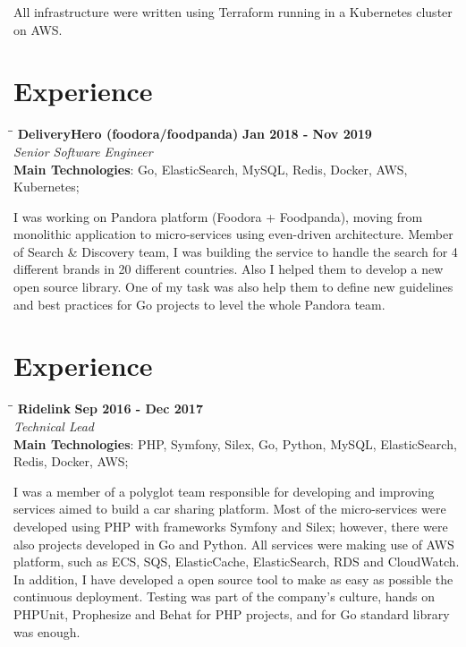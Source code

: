 \documentclass[margin]{res}
\begin{document}
\begin{resume}
All infrastructure were written using Terraform running in a Kubernetes cluster on AWS.

\section{Experience}
\vspace{-0.1in}
    \begin{tabbing}
    \hspace{2.3in}\= \hspace{1.7in}\= \kill %
    \textbf{DeliveryHero (foodora/foodpanda)}    \>\>\textbf{Jan 2018 - Nov 2019}\\
    \textit{Senior Software Engineer}\\
    \textbf{Main Technologies}: Go, ElasticSearch, MySQL, Redis, Docker, AWS, Kubernetes;
    \end{tabbing}\vspace{-20pt}      %
    \vspace{2mm}
I was working on Pandora platform (Foodora + Foodpanda), moving from monolithic application to micro-services using even-driven architecture. Member of Search \& Discovery team, I was building the service to handle the search for 4 different brands in 20 different countries.
Also I helped them to develop a new open source library. One of my task was also help them to define new guidelines and best practices for Go projects to level the whole Pandora team.

\section{Experience}
\vspace{-0.1in}
    \begin{tabbing}
    \hspace{2.3in}\= \hspace{1.7in}\= \kill %
    \textbf{Ridelink}    \>\>\textbf{Sep 2016 - Dec 2017}\\
    \textit{Technical Lead}\\
    \textbf{Main Technologies}: PHP, Symfony, Silex, Go, Python, MySQL, ElasticSearch, \\Redis, Docker, AWS;
    \end{tabbing}\vspace{-20pt}      %
    \vspace{2mm}
I was a member of a polyglot team responsible for developing and improving services aimed to build a car sharing platform. Most of the micro-services were developed using PHP with frameworks Symfony and Silex; however, there were also projects developed in Go and Python. All services were making use of AWS platform, such as ECS, SQS, ElasticCache, ElasticSearch, RDS and CloudWatch. In addition, I have developed a open source tool to make as easy as possible the continuous deployment. Testing was part of the company’s culture, hands on PHPUnit, Prophesize and Behat for PHP projects, and for Go standard library was enough.


\end{resume}
\end{document}
